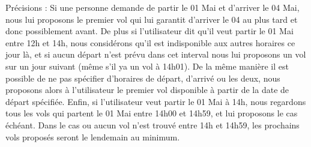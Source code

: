 \documentclass[]{article}
\begin{document}
{Précisions : Si une personne demande de partir le 01 Mai et d’arriver le 04 Mai, nous lui proposons le premier vol qui lui garantit d’arriver le 04 au plus tard et donc possiblement avant. De plus si l’utilisateur dit qu’il veut partir le 01 Mai entre 12h et 14h, nous considérons qu’il est indisponible aux autres horaires ce jour là, et si aucun départ n’est prévu dans cet interval nous lui proposons un vol sur un jour suivant (même s'il ya un vol à 14h01). De la même manière il est possible de ne pas spécifier d’horaires de départ, d’arrivé ou les deux, nous proposons alors à l’utilisateur le premier vol disponible à partir de la date de départ spécifiée. Enfin, si l’utilisateur veut partir le 01 Mai à 14h, nous regardons tous les vols qui partent le 01 Mai entre 14h00 et 14h59, et lui proposons le cas échéant. Dans le cas ou aucun vol n’est trouvé entre 14h et 14h59, les prochains vols proposés seront le lendemain au minimum.
}
\end{document}
